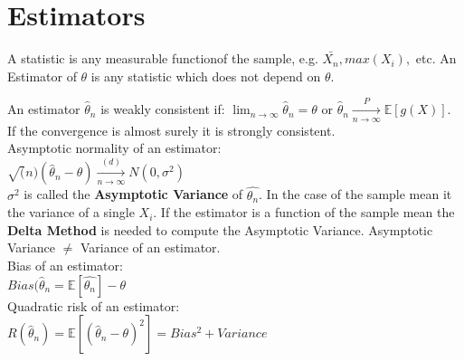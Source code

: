 \section{Estimators}

A statistic is any measurable functionof the sample, e.g. $\bar{X_n}, max(X_i),$ etc. An Estimator of $\theta$ is any statistic which does not depend on $\theta$.

An estimator $\hat{\theta }_ n$ is weakly consistent if: $\displaystyle \lim _{n \to \infty } \hat{\theta }_ n = \theta$ or $ \hat{\theta}_n \xrightarrow[n \rightarrow \infty]{P} \mathbb{E}[g(X)]$. If the convergence is almost surely it is strongly consistent.\\

Asymptotic normality of an estimator:\\

$\sqrt(n) (\hat{\theta}_n-\theta) \xrightarrow[n \rightarrow \infty]{(d)} N(0,\sigma^2)$\\

$\sigma^2$ is called the \textbf{Asymptotic Variance} of $\hat{\theta_n}$. In the case of the sample mean it the variance of a single $X_i$. If the estimator is a function of the sample mean the \textbf{Delta Method} is needed to compute the Asymptotic Variance. Asymptotic Variance $\neq$ Variance of an estimator.\\

Bias of an estimator:\\

$Bias(\hat{\theta}_n = \mathbb{E}[\hat{\theta_n}] - \theta$\\

Quadratic risk of an estimator:\\

$R(\hat{\theta}_n)= \mathbb{E}[(\hat{\theta}_n-\theta)^2] = Bias^2 + Variance$\\